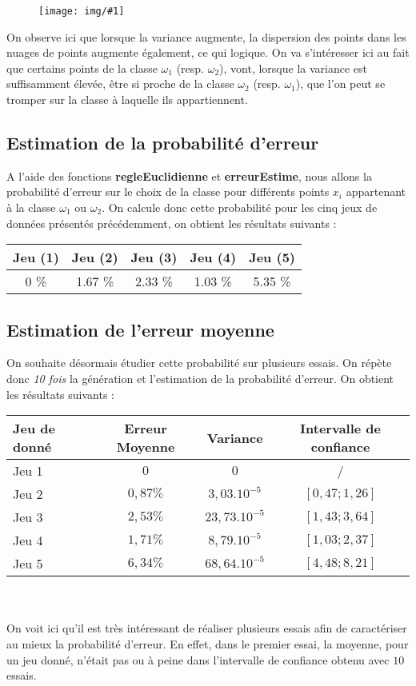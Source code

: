 \documentclass[a4paper,11pt]{article}
\newcommand{\InsertFig}[1]{
\begin{figure}[H]
\begin{center}
\texttt{[image: img/\#1]}
\end{center}
\end{figure}}
\begin{document}
\InsertFig{echant}

\noindent On observe ici que lorsque la variance augmente, la dispersion des points dans les nuages de points augmente également, ce qui logique. On va s'intéresser ici au fait que certains points de la classe $\omega_1$ (resp. $\omega_2$), vont, lorsque la variance est suffisamment élevée, être si proche de la classe $\omega_2$ (resp. $\omega_1$), que l'on peut se tromper sur la classe à laquelle ils appartiennent.

\subsection{Estimation de la probabilité d'erreur}

\noindent A l'aide des fonctions \textbf{regleEuclidienne} et \textbf{erreurEstime}, nous allons la probabilité d'erreur sur le choix de la classe pour différents points $x_i$ appartenant à la classe $\omega_1$ ou $\omega_2$.
\noindent On calcule donc cette probabilité pour les cinq jeux de données présentés précédemment, on obtient les résultats suivants : 
\begin{center}
\begin{tabular}{|c|c|c|c|c|}
  \hline
  Jeu (1) & Jeu (2) & Jeu (3) & Jeu (4) & Jeu (5)\\
  \hline
  0  \% & 1.67 \% & 2.33  \% & 1.03 \% & 5.35 \% \\
  \hline
\end{tabular}
\end{center}

\subsection{Estimation de l'erreur moyenne}

\noindent On souhaite désormais étudier cette probabilité sur plusieurs essais. On répète donc \textit{10 fois} la génération et l'estimation de la probabilité d'erreur. On obtient les résultats suivants : \\
\begin{center}
\begin{tabular}{|l|c|c|c|}
\hline
Jeu de donné & Erreur Moyenne &Variance & Intervalle de confiance  \\
\hline
Jeu 1 & $0$ & $0$ & / \\
Jeu 2 & $0,87\%$ & $3,03.10^{-5}$ & $[0,47;1,26]$ \\
Jeu 3 & $2,53\%$ & $23,73.10^{-5}$ & $[1,43;3,64]$ \\
Jeu 4 & $1,71\%$ & $8,79.10^{-5}$ & $[1,03;2,37]$ \\
Jeu 5 & $6,34\%$ & $68,64.10^{-5}$ & $[4,48;8,21]$ \\ 
\hline
\end{tabular}
\end{center}
\\ \\
\noindent On voit ici qu'il est très intéressant de réaliser plusieurs essais afin de caractériser au mieux la probabilité d'erreur. En effet, dans le premier essai, la moyenne, pour un jeu donné, n'était pas ou à peine dans l'intervalle de confiance obtenu avec $10$ essais. 
\end{document}
